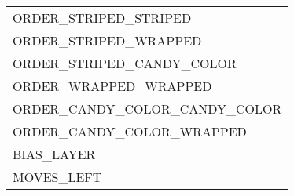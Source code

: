 \begin{tabular}{l}
    ORDER\_STRIPED\_STRIPED \\ 
    ORDER\_STRIPED\_WRAPPED \\ 
    ORDER\_STRIPED\_CANDY\_COLOR \\ 
    ORDER\_WRAPPED\_WRAPPED \\ 
    ORDER\_CANDY\_COLOR\_CANDY\_COLOR \\ 
    ORDER\_CANDY\_COLOR\_WRAPPED\\
    BIAS\_LAYER \\
    MOVES\_LEFT \\

    \bottomrule
    \end{tabular}
